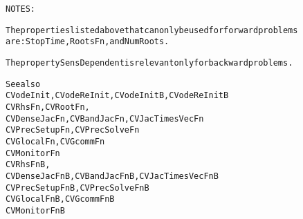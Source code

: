 \begin{alltt}
NOTES:

   The properties listed above that can only be used for forward problems
   are: StopTime, RootsFn, and NumRoots.

   The property SensDependent is relevant only for backward problems.


   See also
        CVodeInit, CVodeReInit, CVodeInitB, CVodeReInitB
        CVRhsFn, CVRootFn,
        CVDenseJacFn, CVBandJacFn, CVJacTimesVecFn
        CVPrecSetupFn, CVPrecSolveFn
        CVGlocalFn, CVGcommFn
        CVMonitorFn
        CVRhsFnB,
        CVDenseJacFnB, CVBandJacFnB, CVJacTimesVecFnB
        CVPrecSetupFnB, CVPrecSolveFnB
        CVGlocalFnB, CVGcommFnB
        CVMonitorFnB
\end{alltt}






\vspace{0.1in}